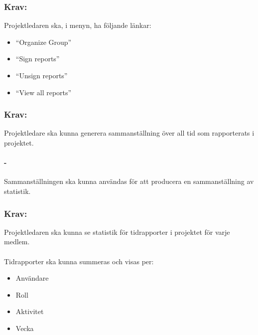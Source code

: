 \documentclass[paper=a4, fontsize=11pt,twoside]{article}
\begin{document}
\paragraph{}

\subsubsection{Krav:}
 Projektledaren ska, i menyn, ha följande länkar:
 \begin{itemize}
 \item “Organize Group”
 \item “Sign reports”
 \item “Unsign reports”
 \item “View all reports”
 \end{itemize}

\paragraph{}

\subsubsection{Krav:}
Projektledare ska kunna generera sammanställning över all tid som rapporterats i projektet.
\paragraph{-}
Sammanställningen ska kunna användas för att producera en sammanställning av statistik.

\newpage
\subsubsection{Krav:}
Projektledaren ska kunna se statistik för tidrapporter i projektet för varje medlem.
\paragraph{}
Tidrapporter ska kunna summeras och visas per:
\begin{itemize}
\item Användare
\item Roll
\item Aktivitet
\item Vecka
\end{itemize}
\end{document}
